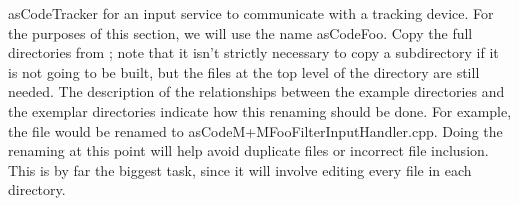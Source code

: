 asCode{Tracker} for an input service to communicate with a tracking device.
For the purposes of this section, we will use the name asCode{Foo}.
\tertiaryEnd{}
Copy the full directories from ; note that it isn't strictly necessary
to copy a subdirectory if it is not going to be built, but the files at the top level of
the directory are still needed.
\tertiaryEnd{}
The description of the relationships between the example directories and the exemplar
directories indicate how this renaming should be done.
For example, the file  would be renamed to
asCode{M+MFooFilterInputHandler.cpp}.
Doing the renaming at this point will help avoid duplicate files or incorrect file
inclusion.
\tertiaryEnd{}
This is by far the biggest task, since it will involve editing every file in each
directory.
